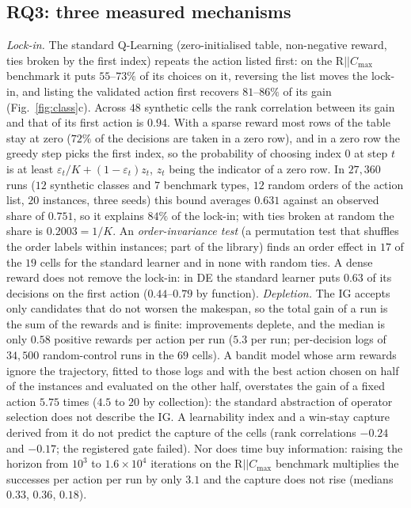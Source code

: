\documentclass[conference,a4paper]{IEEEtran}
\newcommand{\Cmax}{C_{\max}}
\begin{document}
\subsection{RQ3: three measured mechanisms}
\label{sec:mech}
\emph{Lock-in.} The standard Q-Learning (zero-initialised table, non-negative reward, ties broken by the first index) repeats the action listed first: on the R$||\Cmax$ benchmark it puts $55$--$73\%$ of its choices on it, reversing the list moves the lock-in, and listing the validated action first recovers $81$--$86\%$ of its gain (Fig.~\ref{fig:class}c). Across $48$ synthetic cells the rank correlation between its gain and that of its first action is $0.94$.
With a sparse reward most rows of the table stay at zero ($72\%$ of the decisions are taken in a zero row), and in a zero row the greedy step picks the first index, so the probability of choosing index $0$ at step $t$ is at least $\varepsilon_t/K+(1-\varepsilon_t)z_t$, $z_t$ being the indicator of a zero row.
In $27{,}360$ runs ($12$ synthetic classes and $7$ benchmark types, $12$ random orders of the action list, $20$ instances, three seeds) this bound averages $0.631$ against an observed share of $0.751$, so it explains $84\%$ of the lock-in; with ties broken at random the share is $0.2003=1/K$.
An \emph{order-invariance test} (a permutation test that shuffles the order labels within instances; part of the library) finds an order effect in $17$ of the $19$ cells for the standard learner and in none with random ties.
A dense reward does not remove the lock-in: in DE the standard learner puts $0.63$ of its decisions on the first action ($0.44$--$0.79$ by function).
\emph{Depletion.} The IG accepts only candidates that do not worsen the makespan, so the total gain of a run is the sum of the rewards and is finite: improvements deplete, and the median is only $0.58$ positive rewards per action per run ($5.3$ per run; per-decision logs of $34{,}500$ random-control runs in the $69$ cells).
A bandit model whose arm rewards ignore the trajectory, fitted to those logs and with the best action chosen on half of the instances and evaluated on the other half, overstates the gain of a fixed action $5.75$ times ($4.5$ to $20$ by collection): the standard abstraction of operator selection does not describe the IG.
A learnability index and a win-stay capture derived from it do not predict the capture of the cells (rank correlations $-0.24$ and $-0.17$; the registered gate failed).
Nor does time buy information: raising the horizon from $10^3$ to $1.6\times10^4$ iterations on the R$||\Cmax$ benchmark multiplies the successes per action per run by only $3.1$ and the capture does not rise (medians $0.33$, $0.36$, $0.18$).
\end{document}
